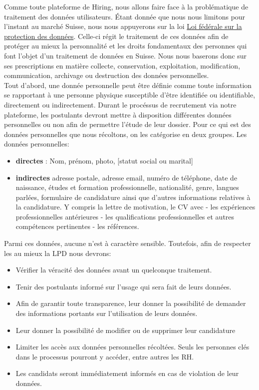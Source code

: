  Comme toute plateforme de Hiring, nous allons faire face à la problématique de traitement des données utilisateurs. Étant donnée que nous nous limitons pour l'instant au marché Suisse, nous nous appuyerons sur la loi \href{https://www.fedlex.admin.ch/eli/cc/1993/1945_1945_1945/fr}{Loi fédérale
sur la protection des données}. Celle-ci régit le traitement de ces données afin de protéger au mieux la personnalité et les droits fondamentaux des personnes qui font l’objet d’un traitement de données en Suisse. Nous nous baserons donc sur ses prescriptions en matière collecte, conservation, exploitation, modification,  communication, archivage ou destruction des données personnelles.\\
Tout d'abord, une donnée personnelle peut être définie comme toute information se rapportant à une personne physique susceptible d'être identifiée ou identifiable, directement ou indirectement.  Durant le procéssus de recrutement via notre plateforme, les postulants devront mettre à disposition différentes données personnelles ou non afin de permettre l'étude de leur dossier. Pour ce qui est des données personnelles que nous récoltons, on les catégorise en deux groupes. Les données personnelles:
\begin{itemize}
\item \textbf{directes} : Nom, prénom, photo, [statut social ou marital]
\item \textbf{indirectes} adresse postale, adresse email, numéro de téléphone, date de naissance, études et formation professionnelle, nationalité, genre, langues parlées, formulaire de candidature ainsi que d'autres informations relatives à la candidature. Y compris la lettre de motivation, le CV avec - les expériences professionnelles antérieures - les qualifications professionnelles et autres compétences pertinentes - les références.
\end{itemize}
Parmi ces données, aucune n'est à caractère sensible. Toutefois, afin de respecter les au mieux la LPD nous devrons:
\begin{itemize}
    \item Vérifier la véracité des données avant un quelconque traitement.
    \item Tenir des postulants informé sur l'usage qui sera fait de leurs données.
    \item Afin de garantir toute transparence, leur donner la possibilité de demander des informations portants sur l'utilisation de leurs données.
    \item Leur donner la possibilité de modifier ou de supprimer leur candidature
    \item Limiter les accès aux données personnelles récoltées. Seuls les personnes clés dans le processus pourront y accéder, entre autres les RH.
    \item Les candidats seront immédiatement informés en cas de violation de leur données.
\end{itemize}

